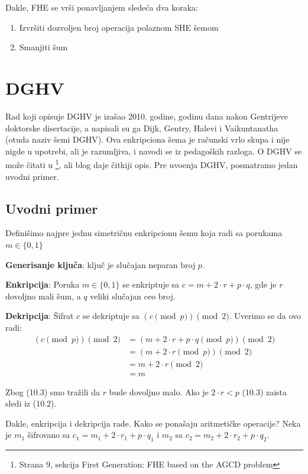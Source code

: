 Dakle, FHE se vr\v si ponavljanjem slede\' ca dva koraka:
\begin{enumerate}
\item  Izvr\v siti dozvoljen broj operacija polaznom SHE \v semom
\item  Smanjiti \v sum 
\end{enumerate}

\section{DGHV}
Rad koji opisuje DGHV je iza\v sao 2010. godine, godinu dana nakon Gentrijeve doktorske disertacije, a napisali su ga Dijk, Gentry, Halevi i Vaikuntanatha (otuda naziv \v semi DGHV).
Ova enkripciona \v sema je ra\v cunski vrlo skupa i nije nigde u upotrebi, ali je razumljiva, i navodi se iz pedago\v skih razloga. O DGHV se mo\v ze \v citati u \cite{marcolla2022survey} \footnote{Strana 9, sekcija First Generation: FHE based on the AGCD problem}, ali blog \cite{paliares2024dghv} daje \v citkiji opis. Pre uvo\dj enja DGHV, posmatramo jedan uvodni primer.

\subsection{Uvodni primer}
Defini\v simo najpre jednu simetri\v cnu enkripcionu \v semu koja radi sa porukama $m\in \{0, 1\}$

\textbf{Generisanje klju\v ca}: klju\v c je slu\v cajan neparan broj $p$.

\textbf{Enkripcija}: Poruka $m\in \{0, 1\}$ se enkriptuje sa $c=m + 2\cdot r + p\cdot q$, gde je $r$ dovoljno mali \v sum, a $q$ veliki slu\v cajan ceo broj.

\textbf{Dekripcija}: \v Sifrat $c$ se dekriptuje sa $(c \pmod{p})\pmod{2}$. Uverimo se da ovo radi:
\begin{align}
    (c \pmod{p})\pmod{2} &= (m + 2\cdot r + p\cdot q \pmod{p})\pmod{2}\\
    &= (m + 2\cdot r \pmod{p})\pmod{2}\\
    &= m + 2\cdot r \pmod{2}\\
    &= m 
\end{align}

Zbog (10.3) smo tra\v zili da $r$ bude dovoljno malo. Ako je $2\cdot r < p$ (10.3) zaista sledi iz (10.2).

Dakle, enkripcija i dekripcija rade. Kako se pona\v saju aritmeti\v cke operacije? Neka je $m_1$ \v sifrovano sa $c_1=m_1 + 2\cdot r_1 + p\cdot q_1$ i $m_2$ sa $c_2=m_2 + 2\cdot r_2 + p\cdot q_2$.

